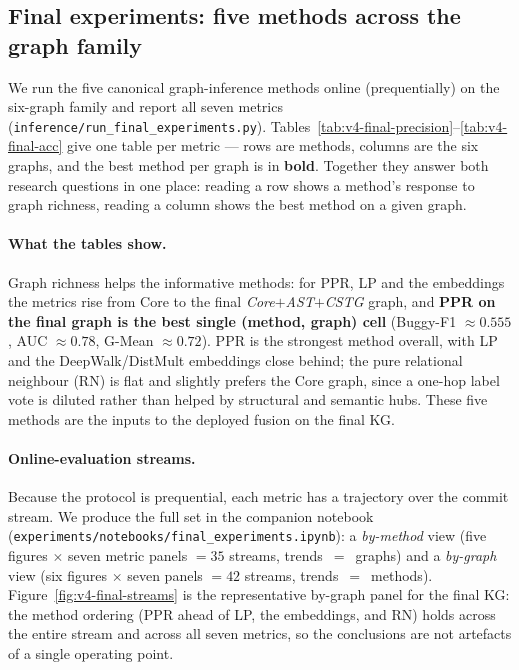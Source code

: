\documentclass[11pt,a4paper]{article}
\newcommand{\code}[1]{\texttt{#1}}
\begin{document}
	\subsection{Final experiments: five methods across the graph family}\label{sec:v4-finalexp}
	We run the five canonical graph-inference methods online (prequentially) on the
	six-graph family and report all seven metrics
	(\code{inference/run\_final\_experiments.py}). Tables~\ref{tab:v4-final-precision}--\ref{tab:v4-final-acc}
	give one table per metric --- rows are methods, columns are the six graphs, and the
	best method per graph is in \textbf{bold}. Together they answer both research
	questions in one place: reading a row shows a method's response to graph richness,
	reading a column shows the best method on a given graph.

	\paragraph{What the tables show.} Graph richness helps the informative methods:
	for PPR, LP and the embeddings the metrics rise from Core to the final
	\emph{Core$+$AST$+$CSTG} graph, and \textbf{PPR on the final graph is the best
	single (method, graph) cell} (Buggy-F1 $\approx0.555$, AUC $\approx0.78$,
	G-Mean $\approx0.72$). PPR is the strongest method overall, with LP and the
	DeepWalk/DistMult embeddings close behind; the pure relational neighbour (RN) is
	flat and slightly prefers the Core graph, since a one-hop label vote is diluted
	rather than helped by structural and semantic hubs. These five methods are the
	inputs to the deployed fusion on the final KG.

	

	\paragraph{Online-evaluation streams.} Because the protocol is prequential, each
	metric has a trajectory over the commit stream. We produce the full set in the
	companion notebook (\code{experiments/notebooks/final\_experiments.ipynb}): a
	\emph{by-method} view (five figures $\times$ seven metric panels $=35$ streams,
	trends~$=$~graphs) and a \emph{by-graph} view (six figures $\times$ seven panels
	$=42$ streams, trends~$=$~methods). Figure~\ref{fig:v4-final-streams} is the
	representative by-graph panel for the final KG: the method ordering (PPR ahead of
	LP, the embeddings, and RN) holds across the entire stream and across all seven
	metrics, so the conclusions are not artefacts of a single operating point.
\end{document}
